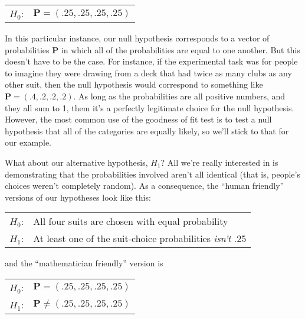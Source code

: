 \smallskip
\begin{tabular}{ll}
$H_0$:\hspace*{0.5cm}  &  $\bm{P} = (.25, .25, .25, .25) $
\end{tabular} 
\smallskip

In this particular instance, our null hypothesis corresponds to a vector of probabilities $\bm{P}$ in which all of the probabilities are equal to one another. But this doesn't have to be the case. For instance, if the experimental task was for people to imagine they were drawing from a deck that had twice as many clubs as any other suit, then the null hypothesis would correspond to something like $\bm{P} = (.4, .2, .2, .2)$. As long as the probabilities are all positive numbers, and they all sum to 1, them it's a perfectly legitimate choice for the null hypothesis. However, the most common use of the goodness of fit test is to test a null hypothesis that all of the categories are equally likely, so we'll stick to that for our example. 

What about our alternative hypothesis, $H_1$? All we're really interested in is demonstrating that the probabilities involved aren't all identical (that is, people's choices weren't completely random). As a consequence, the ``human friendly'' versions of our hypotheses look like this:

\smallskip
\begin{tabular}{ll}
$H_0$: \hspace*{0.5cm} & All four suits are chosen with equal probability \\
$H_1$: \hspace*{0.5cm} & At least one of the suit-choice probabilities {\it isn't} .25
\end{tabular} 
\smallskip

\noindent
and the ``mathematician friendly'' version is

\smallskip
\begin{tabular}{ll}
$H_0$:\hspace*{0.5cm}  &  $\bm{P} = (.25, .25, .25, .25)$ \\
$H_1$: \hspace*{0.5cm} & $\bm{P} \neq (.25,.25,.25,.25)$ \\
\end{tabular} 
\smallskip



